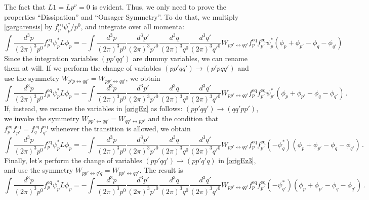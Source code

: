 \documentclass[a4paper, amsfonts, amssymb, amsmath, reprint, showkeys, nofootinbib, twoside, onecolumn,notitlepage,,longbibliography]{revtex4-2}
\theoremstyle{definition}
\theoremstyle{theorem}
\theoremstyle{corollary}
\begin{document}
The fact that $L1=Lp^\nu=0$ is evident. Thus, we only need to prove the properties ``Dissipation'' and ``Onsager Symmetry''. To do that, we multiply \eqref{gargarensis} by $f^{\text{eq}}_p \psi^*_p/p^0$, and integrate over all momenta:
\begin{equation}\label{origEz}
 \int \dfrac{d^3p}{(2\pi)^3 p^0} f^{\text{eq}}_{p} \psi_p^* L\phi_p=-
\int \dfrac{d^3p}{(2\pi)^3 p^0} \dfrac{d^3p'}{(2\pi)^3p'^0} \dfrac{d^3q}{(2\pi)^3q^0} \dfrac{d^3q'}{(2\pi)^3q'^0} W_{pp'\leftrightarrow qq'} f^{\text{eq}}_{p} f^{\text{eq}}_{p'} \psi_p^*(\phi_p{+}\phi_{p'}{-}\phi_q{-}\phi_{q'})
\end{equation}
Since the integration variables $(pp'qq')$ are dummy variables, we can rename them at will. If we perform the change of variables $(pp'qq') \rightarrow (p'pqq')$ and use the symmetry $W_{p'p\leftrightarrow qq'}=W_{pp'\leftrightarrow qq'}$, we obtain
\begin{equation}\label{origEz2}
     \int \dfrac{d^3p}{(2\pi)^3 p^0} f^{\text{eq}}_{p} \psi_p^* L\phi_p=-
\int \dfrac{d^3p}{(2\pi)^3 p^0} \dfrac{d^3p'}{(2\pi)^3p'^0} \dfrac{d^3q}{(2\pi)^3q^0} \dfrac{d^3q'}{(2\pi)^3q'^0} W_{pp'\leftrightarrow qq'} f^{\text{eq}}_{p} f^{\text{eq}}_{p'} \psi_{p'}^*(\phi_p{+}\phi_{p'}{-}\phi_q{-}\phi_{q'}) \, .
\end{equation}
If, instead, we rename the variables in \eqref{origEz} as follows: $(pp'qq')\rightarrow (qq'pp')$, we invoke the symmetry $W_{pp'\leftrightarrow qq'}=W_{qq'\leftrightarrow pp'}$ and the condition that $f^{\text{eq}}_{p} f^{\text{eq}}_{p'}= f^{\text{eq}}_{q} f^{\text{eq}}_{q'}$ whenever the transition is allowed, we obtain
\begin{equation}\label{origEz3}
 \int \dfrac{d^3p}{(2\pi)^3 p^0} f^{\text{eq}}_{p} \psi_p^* L\phi_p=-
\int \dfrac{d^3p}{(2\pi)^3 p^0} \dfrac{d^3p'}{(2\pi)^3p'^0} \dfrac{d^3q}{(2\pi)^3q^0} \dfrac{d^3q'}{(2\pi)^3q'^0} W_{pp'\leftrightarrow qq'} f^{\text{eq}}_{p} f^{\text{eq}}_{p'} (-\psi_q^*)(\phi_p{+}\phi_{p'}{-}\phi_q{-}\phi_{q'})\, .
\end{equation}
Finally, let's perform the change of variables $(pp'qq') \rightarrow (pp'q'q)$ in \eqref{origEz3}, and use the symmetry $W_{pp'\leftrightarrow q'q}=W_{pp'\leftrightarrow qq'}$. The result is 
\begin{equation}\label{origEz4}
 \int \dfrac{d^3p}{(2\pi)^3 p^0} f^{\text{eq}}_{p} \psi_p^* L\phi_p=-
\int \dfrac{d^3p}{(2\pi)^3 p^0} \dfrac{d^3p'}{(2\pi)^3p'^0} \dfrac{d^3q}{(2\pi)^3q^0} \dfrac{d^3q'}{(2\pi)^3q'^0} W_{pp'\leftrightarrow qq'} f^{\text{eq}}_{p} f^{\text{eq}}_{p'} (-\psi_{q'}^*)(\phi_p{+}\phi_{p'}{-}\phi_q{-}\phi_{q'})\, .
\end{equation}
\end{document}
